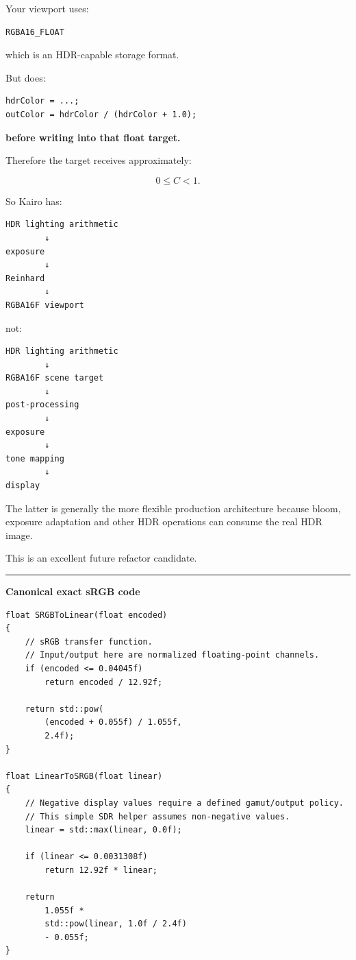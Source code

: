 Your viewport uses:

\begin{verbatim}
RGBA16_FLOAT
\end{verbatim}

which is an HDR-capable storage format.

But  does:

\begin{verbatim}
hdrColor = ...;
outColor = hdrColor / (hdrColor + 1.0);
\end{verbatim}

\textbf{before writing into that float target.}

Therefore the target receives approximately:

\[
0\le C<1.
\]

So Kairo has:

\begin{verbatim}
HDR lighting arithmetic
        ↓
exposure
        ↓
Reinhard
        ↓
RGBA16F viewport
\end{verbatim}

not:

\begin{verbatim}
HDR lighting arithmetic
        ↓
RGBA16F scene target
        ↓
post-processing
        ↓
exposure
        ↓
tone mapping
        ↓
display
\end{verbatim}

The latter is generally the more flexible production architecture because bloom, exposure adaptation and other HDR operations can consume the real HDR image.

This is an excellent future refactor candidate.

\begin{center}\rule{0.5\linewidth}{0.5pt}\end{center}

\textbf{Canonical exact sRGB code}

\begin{verbatim}
float SRGBToLinear(float encoded)
{
    // sRGB transfer function.
    // Input/output here are normalized floating-point channels.
    if (encoded <= 0.04045f)
        return encoded / 12.92f;

    return std::pow(
        (encoded + 0.055f) / 1.055f,
        2.4f);
}

float LinearToSRGB(float linear)
{
    // Negative display values require a defined gamut/output policy.
    // This simple SDR helper assumes non-negative values.
    linear = std::max(linear, 0.0f);

    if (linear <= 0.0031308f)
        return 12.92f * linear;

    return
        1.055f *
        std::pow(linear, 1.0f / 2.4f)
        - 0.055f;
}
\end{verbatim}

